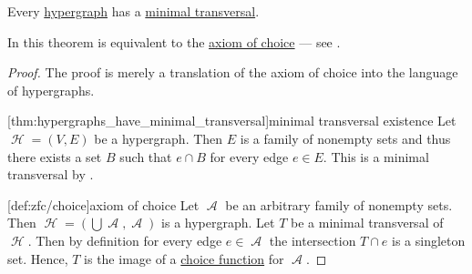 \begin{theorem}\label{thm:hypergraphs_have_minimal_transversal}
  Every \hyperref[def:hypergraph]{hypergraph} has a \hyperref[def:minimal_hypergraph_transversal]{minimal transversal}.

  In \hyperref[def:zfc]{} this theorem is equivalent to the \hyperref[def:zfc/choice]{axiom of choice} --- see .
\end{theorem}
\begin{proof}
  The proof is merely a translation of the axiom of choice into the language of hypergraphs.

  [thm:hypergraphs_have_minimal_transversal]{minimal transversal existence} Let \( \mscrH = (V, E) \) be a hypergraph. Then \( E \) is a family of nonempty sets and thus there exists a set \( B \) such that \( e \cap B \) for every edge \( e \in E \). This is a minimal transversal by .

  [def:zfc/choice]{axiom of choice} Let \( \mscrA \) be an arbitrary family of nonempty sets. Then \( \mscrH = (\bigcup \mscrA, \mscrA) \) is a hypergraph. Let \( T \) be a minimal transversal of \( \mscrH \). Then by definition for every edge \( e \in \mscrA \) the intersection \( T \cap e \) is a singleton set. Hence, \( T \) is the image of a \hyperref[def:choice_function]{choice function} for \( \mscrA \).
\end{proof}
